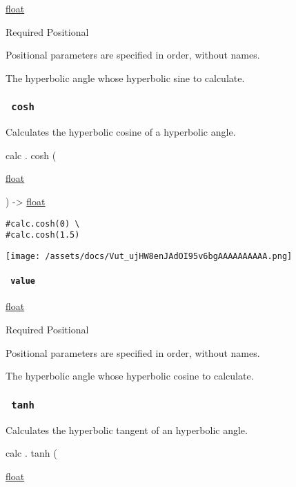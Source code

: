 \href{/docs/reference/foundations/float/}{float}

{Required} {{ Positional }}

\label{functions-sinh-value-positional-tooltip}
Positional parameters are specified in order, without names.

The hyperbolic angle whose hyperbolic sine to calculate.

\subsubsection{\texorpdfstring{\texttt{\ cosh\ }}{ cosh }}\label{functions-cosh}

Calculates the hyperbolic cosine of a hyperbolic angle.

calc { . } { cosh } (

{ \href{/docs/reference/foundations/float/}{float} }

) -\textgreater{} \href{/docs/reference/foundations/float/}{float}

\begin{verbatim}
#calc.cosh(0) \
#calc.cosh(1.5)
\end{verbatim}

\texttt{[image: /assets/docs/Vut\_ujHW8enJAdOI95v6bgAAAAAAAAAA.png]}

\paragraph{\texorpdfstring{\texttt{\ value\ }}{ value }}\label{functions-cosh-value}

\href{/docs/reference/foundations/float/}{float}

{Required} {{ Positional }}

\label{functions-cosh-value-positional-tooltip}
Positional parameters are specified in order, without names.

The hyperbolic angle whose hyperbolic cosine to calculate.

\subsubsection{\texorpdfstring{\texttt{\ tanh\ }}{ tanh }}\label{functions-tanh}

Calculates the hyperbolic tangent of an hyperbolic angle.

calc { . } { tanh } (

{ \href{/docs/reference/foundations/float/}{float} }

